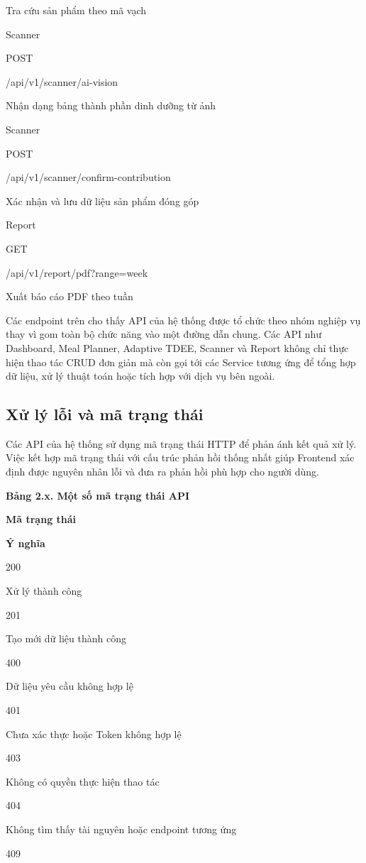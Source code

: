 \documentclass[12pt, a4paper]{report}
\begin{document}
Tra cứu sản phẩm theo mã vạch

Scanner

POST

/api/v1/scanner/ai-vision

Nhận dạng bảng thành phần dinh dưỡng từ ảnh

Scanner

POST

/api/v1/scanner/confirm-contribution

Xác nhận và lưu dữ liệu sản phẩm đóng góp

Report

GET

/api/v1/report/pdf?range=week

Xuất báo cáo PDF theo tuần

Các endpoint trên cho thấy API của hệ thống được tổ chức theo nhóm nghiệp vụ thay vì gom toàn bộ chức năng vào một đường dẫn chung. Các API như Dashboard, Meal Planner, Adaptive TDEE, Scanner và Report không chỉ thực hiện thao tác CRUD đơn giản mà còn gọi tới các Service tương ứng để tổng hợp dữ liệu, xử lý thuật toán hoặc tích hợp với dịch vụ bên ngoài.

\subsection{Xử lý lỗi và mã trạng thái}Các API của hệ thống sử dụng mã trạng thái HTTP để phản ánh kết quả xử lý. Việc kết hợp mã trạng thái với cấu trúc phản hồi thống nhất giúp Frontend xác định được nguyên nhân lỗi và đưa ra phản hồi phù hợp cho người dùng.

\textbf{Bảng 2.x. Một số mã trạng thái API}

\textbf{Mã trạng thái}

\textbf{Ý nghĩa}

200

Xử lý thành công

201

Tạo mới dữ liệu thành công

400

Dữ liệu yêu cầu không hợp lệ

401

Chưa xác thực hoặc Token không hợp lệ

403

Không có quyền thực hiện thao tác

404

Không tìm thấy tài nguyên hoặc endpoint tương ứng

409
\end{document}
